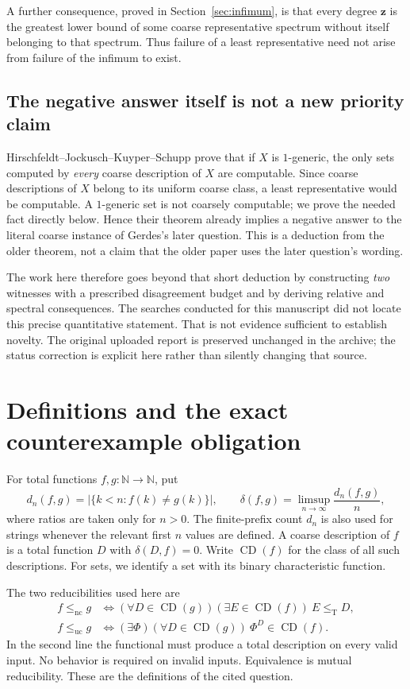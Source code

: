 \documentclass[11pt,a4paper]{article}
\newcommand{\N}{\mathbb N}
\newcommand{\leT}{\leq_{\mathrm T}}
\newcommand{\CD}{\operatorname{CD}}
\newcommand{\nc}{\mathrm{nc}}
\newcommand{\uc}{\mathrm{uc}}
\newcommand{\zz}{\mathbf z}
\theoremstyle{definition}\newtheorem{definition}[theorem]{Definition}
\theoremstyle{remark}\newtheorem{remark}[theorem]{Remark}
\begin{document}
A further consequence, proved in Section~\ref{sec:infimum}, is that every degree $\zz$ is the greatest lower bound of some coarse representative spectrum without itself belonging to that spectrum. Thus failure of a least representative need not arise from failure of the infimum to exist.

\subsection{The negative answer itself is not a new priority claim}
Hirschfeldt--Jockusch--Kuyper--Schupp prove that if $X$ is $1$-generic, the only sets computed by \emph{every} coarse description of $X$ are computable.\cite[Theorem 4.2]{HJKS} Since coarse descriptions of $X$ belong to its uniform coarse class, a least representative would be computable. A $1$-generic set is not coarsely computable; we prove the needed fact directly below. Hence their theorem already implies a negative answer to the literal coarse instance of Gerdes's later question. This is a deduction from the older theorem, not a claim that the older paper uses the later question's wording.

The work here therefore goes beyond that short deduction by constructing \emph{two} witnesses with a prescribed disagreement budget and by deriving relative and spectral consequences. The searches conducted for this manuscript did not locate this precise quantitative statement. That is not evidence sufficient to establish novelty. The original uploaded report is preserved unchanged in the archive; the status correction is explicit here rather than silently changing that source.

\section{Definitions and the exact counterexample obligation}
\label{sec:definitions}

For total functions $f,g:\N\to\N$, put
\[
 d_n(f,g)=|\{k<n:f(k)\ne g(k)\}|,
 \qquad
 \delta(f,g)=\limsup_{n\to\infty}\frac{d_n(f,g)}{n},
\]
where ratios are taken only for $n>0$. The finite-prefix count $d_n$ is also used for strings whenever the relevant first $n$ values are defined. A coarse description of $f$ is a total function $D$ with $\delta(D,f)=0$. Write $\CD(f)$ for the class of all such descriptions. For sets, we identify a set with its binary characteristic function.

The two reducibilities used here are
\begin{align*}
 f\le_\nc g
 &\iff (\forall D\in\CD(g))(\exists E\in\CD(f))\ E\leT D,\\
 f\le_\uc g
 &\iff (\exists\Phi)(\forall D\in\CD(g))\ \Phi^D\in\CD(f).
\end{align*}
In the second line the functional must produce a total description on every valid input. No behavior is required on invalid inputs. Equivalence is mutual reducibility. These are the definitions of the cited question.\cite[Definitions 2.3--2.4]{Gerdes}
\end{document}
